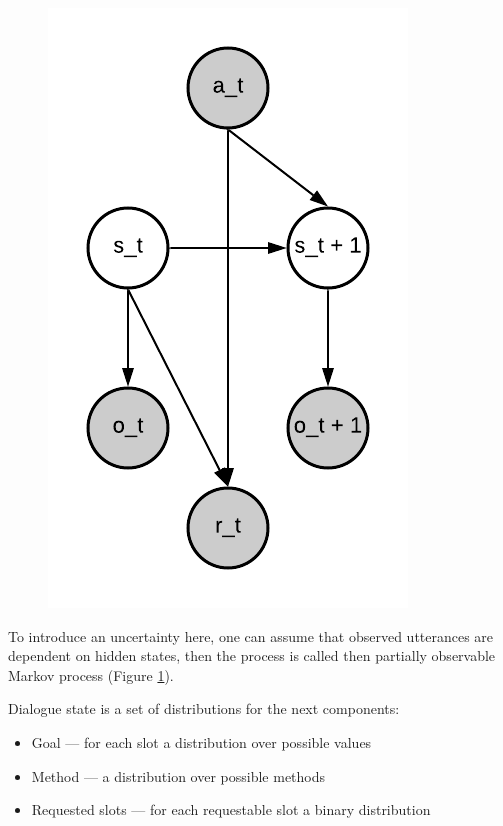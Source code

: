 \documentclass[12pt,titlepage,a4paper]{article}
\begin{document}
\begin{figure}[!htb]
      \includegraphics[width=\linewidth]{partial-markov.png}
      \caption{}
      \label{PartialMarkov}
    \endminipage
\end{figure}

To introduce an uncertainty here, one can assume that observed utteran\-ces are dependent on hidden states, then the process is called then partially observable Markov process (Figure \ref{PartialMarkov}).

Dialogue state is a set of distributions for the next components: 
\begin{itemize}
    \item Goal --- for each slot a distribution over possible values
    \item Method --- a distribution over possible methods
    \item Requested slots --- for each requestable slot a binary distribution
\end{itemize}
\end{document}

